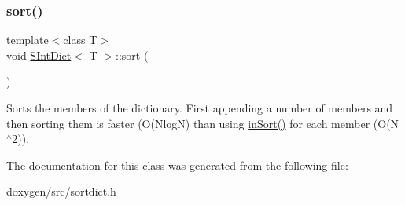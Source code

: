 \subsubsection{\texorpdfstring{sort()}{sort()}}
{\footnotesize\ttfamily template$<$class T$>$ \\
void \mbox{\hyperlink{class_s_int_dict}{S\+Int\+Dict}}$<$ T $>$\+::sort (\begin{DoxyParamCaption}{ }\end{DoxyParamCaption})\hspace{0.3cm}{\ttfamily [inline]}}

Sorts the members of the dictionary. First appending a number of members and then sorting them is faster (O(\+Nlog\+N) than using \mbox{\hyperlink{class_s_int_dict_a16cc84888ede2d895d4df0323608862d}{in\+Sort()}} for each member (O(\+N$^\wedge$2)). 

The documentation for this class was generated from the following file\+:\begin{DoxyCompactItemize}
\item 
doxygen/src/sortdict.\+h\end{DoxyCompactItemize}
